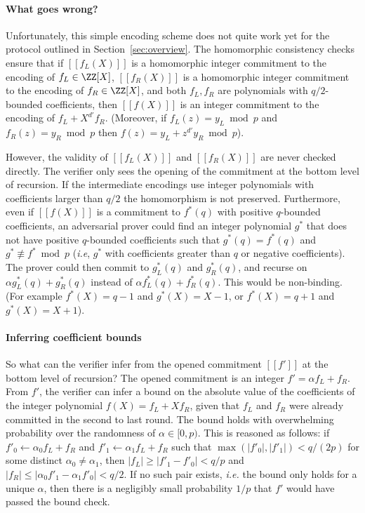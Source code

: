 \paragraph{What goes wrong?} Unfortunately, this simple encoding scheme does not quite work yet for the protocol outlined in Section~\ref{sec:overview}. The homomorphic consistency checks ensure that if $[\![f_L(X)]\!]$ is a homomorphic integer commitment to the encoding of $f_L \in \ZZ[X]$, $[\![f_R(X)]\!]$ is a homomorphic integer commitment to the encoding of $f_R \in \ZZ[X]$, and both $f_L, f_R$ are polynomials with $q/2$-bounded coefficients, then $[\![f(X)]\!]$ is an integer commitment to the encoding of $f_L + X^{d'}f_R$. (Moreover, if $f_L(z) = y_L \bmod p$ and $f_R(z) = y_R \bmod p$ then $f(z) = y_L + z^{d'} y_R \bmod p$). 

However, the validity of $[\![f_L(X)]\!]$ and $[\![f_R(X)]\!]$ are never checked directly. 
The verifier only sees the opening of the commitment at the bottom level of recursion. If the intermediate encodings use integer polynomials with coefficients larger than $q/2$ the homomorphism is not preserved. Furthermore, even if $[\![f(X)]\!]$ is a commitment to $f^*(q)$ with positive $q$-bounded coefficients, an adversarial prover could find an integer polynomial $g^*$ that does not have positive $q$-bounded coefficients such that $g^*(q) = f^*(q)$ and $g^* \not\equiv f^* \bmod p$ (\emph{i.e}, $g^*$ with coefficients greater than $q$ or negative coefficients). 
The prover could then commit to $g^*_L(q)$ and $g^*_R(q)$, and recurse on $\alpha g^*_L(q) + g^*_R(q)$ instead of $\alpha f^*_L(q) + f^*_R(q)$. This would be non-binding. (For example $f^*(X)= q-1$ and $g^*(X)=X-1$, or $f^*(X) = q +1$ and $g^*(X) = X + 1$). 

\paragraph{Inferring coefficient bounds} So what can the verifier infer from the opened commitment $[\![f']\!]$ at the bottom level of recursion? The opened commitment is an integer $f' = \alpha f_L + f_R$. From $f'$, the verifier can infer a bound on the absolute value of the coefficients of the integer polynomial $f(X) = f_L + X f_R$, given that $f_L$ and $f_R$ were already committed in the second to last round. The bound holds with overwhelming probability over the randomness of $\alpha \in [0,p)$. This is reasoned as follows: if $f'_0 \leftarrow \alpha_0 f_L + f_R$ and $f'_1 \leftarrow \alpha_1 f_L + f_R$ such that $\max(|f'_0|, |f'_1|) < q / (2p)$ for some distinct $\alpha_0 \neq \alpha_1$, then $|f_L| \geq |f'_1 - f'_0| < q / p$ and $|f_R| \leq |\alpha_0 f'_1 - \alpha_1 f'_0| < q/2$. If no such pair exists, \emph{i.e.} the bound only holds for a unique $\alpha$, then there is a negligibly small probability $1/p$ that $f'$ would have passed the bound check.


